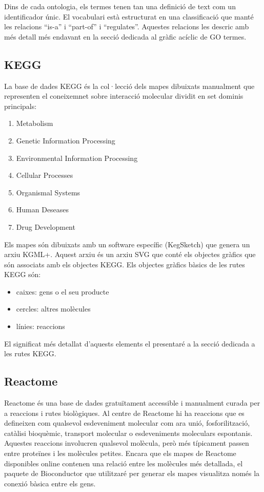 Dins de cada ontologia, els termes tenen tan una definició de text com un identificador únic. El vocabulari està estructurat en una classificació que manté les relacions ``is-a'' i ``part-of'' i ``regulates''. Aquestes relacions les descric amb més detall més endavant en la secció dedicada al gràfic acíclic de \gls{GO} termes.

\subsection{\gls{KEGG}}
La base de dades \gls{KEGG} és la col·lecció dels mapes dibuixats manualment que representen el coneixemnet sobre interacció molecular dividit en set dominis principals:
\begin{enumerate}
\item Metabolism
\item Genetic Information Processing
\item Environmental Information Processing
\item Cellular Processes
\item Organismal Systems
\item Human Deseases
\item Drug Development
\end{enumerate}

Els mapes són dibuixats amb un software específic (KegSketch) que genera un arxiu KGML+. Aquest arxiu és un arxiu SVG que conté els objectes gràfics que són associats amb els objectes \gls{KEGG}. Els objectes gràfics bàsics de les rutes \gls{KEGG} són:
\begin{itemize}
\item caixes: gens o el seu producte
\item cercles: altres molècules
\item línies: reaccions
\end{itemize}
El significat més detallat d'aquests elements el presentaré a la secció dedicada a les rutes \gls{KEGG}.

\subsection{Reactome}

Reactome és una base de dades gratuïtament accessible i manualment curada per a reaccions i rutes biològiques. Al centre de Reactome hi ha reaccions que es defineixen com qualsevol esdeveniment molecular com ara unió, fosforilització, catàlisi bioquèmic, transport molecular o esdeveniments moleculars espontanis. Aquestes reaccions involucren qualsevol molècula, però més típicament passen entre proteïnes i les molècules petites. Encara que els mapes de Reactome disponibles online contenen una relació entre les molècules més detallada, el paquete de \gls{Bioconductor} que utilitzaré per generar els mapes visualitza només la conexió bàsica entre els gens. 

